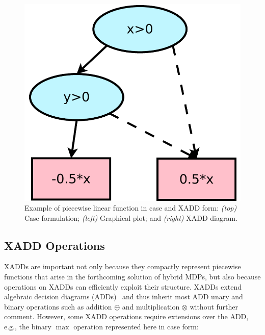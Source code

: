 \begin{figure}[ht!]
\begin{minipage}{0.3\textwidth}
\end{minipage}
\begin{minipage}{0.15\textwidth}
\center
\vspace{-13mm}
\includegraphics[width=\textwidth]{Figures/xadds/dia2.pdf}
\end{minipage}
\vspace{-10mm}

\caption{Example of piecewise linear function in case and XADD form: \emph{(top)} Case formulation; \emph{(left)} Graphical plot; and \emph{(right)} XADD diagram.}
\label{fig:symbex}
\end{figure}

\subsection{XADD Operations} 

XADDs are important not only because they compactly represent piecewise
functions that arise in the forthcoming solution of hybrid MDPs, but
also because operations on XADDs can efficiently exploit their structure.
XADDs extend algebraic decision diagrams (ADDs)~\cite{bahar93add} and
thus inherit most ADD unary and binary operations such as addition
$\oplus$ and multiplication $\otimes$ without further comment.
However, some XADD operations require extensions over the ADD, e.g.,
the binary $\max$ operation represented here in case form:

